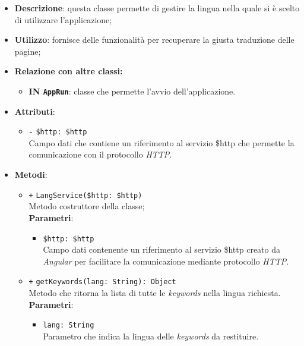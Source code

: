 \begin{itemize}
	\item \textbf{Descrizione}: questa classe permette di gestire la lingua nella quale si è scelto di utilizzare l'applicazione;
	\item \textbf{Utilizzo}: fornisce delle funzionalità per recuperare la giusta traduzione delle pagine;
	\item \textbf{Relazione con altre classi:}
	\begin{itemize}
		\item \textbf{IN \texttt{AppRun}}: classe che permette l'avvio dell'applicazione.
	\end{itemize}
	\item \textbf{Attributi}:
	\begin{itemize}
		\item \texttt{-} \texttt{\$http: \$http} \\ Campo dati che contiene un riferimento al servizio \$http che permette la comunicazione con il protocollo \textit{HTTP}.
	\end{itemize}
	\item \textbf{Metodi}:
	\begin{itemize}
		\item \texttt{+} \texttt{LangService(\$http: \$http)} \\ Metodo costruttore della classe; \\
		\textbf{Parametri}:
		\begin{itemize}
			\item \texttt{\$http: \$http} \\ Campo dati contenente un riferimento al servizio \$http creato da \textit{Angular} per facilitare la comunicazione mediante protocollo \textit{HTTP}.
		\end{itemize}
		\item \texttt{+} \texttt{getKeywords(lang: String): Object} \\Metodo che ritorna la lista di tutte le \textit{keywords} nella lingua richiesta.\\
		\textbf{Parametri}:
		\begin{itemize}
			\item \texttt{lang: String} \\ Parametro che indica la lingua delle \textit{keywords} da restituire.
		\end{itemize}
	\end{itemize}
\end{itemize}